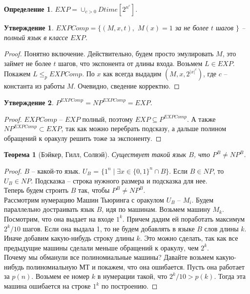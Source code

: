 \documentclass[12pt, letterpaper]{article}
\newtheorem{theorem}{Теорема}[section]
\newtheorem{prop}{Утверждение}[section]
\newtheorem{defi}{Определение}[section]
\newcommand{\leqp}{\leq_{p}}
\begin{document}
\begin{defi}
$EXP = \cup_{c>0} Dtime[2^{n^c}]$. 
\end{defi}

\begin{prop}
$EXPComp = \{(M, x, t), $ $M(x)=1$ за не более $t$ шагов $\}$ -- полный язык в классе $EXP$.
\end{prop}
\begin{proof}
Понятно включение. Действительно, будем просто эмулировать $M$, это займет не более $t$ шагов, что экспонента от длины входа. Возьмем $L \in EXP$. Покажем $L \leqp EXPComp$. По $x$ как всегда выдадим $(M, x, 2^{|x|^c})$, где $c$ -- константа из работы $M$. Очевидно, сведение корректно.
\end{proof}

\begin{prop}
$P^{EXPComp} = NP^{EXPComp} = EXP$.
\end{prop}
\begin{proof}
$EXPComp$ -- $EXP$ полный, поэтому $EXP \subseteq P^{EXPComp}$. А также $NP^{EXPComp} \subset EXP$, так как можно перебрать подсказу, а дальше полином обращений к оракулу решить тоже за экспоненту.
\end{proof}

\begin{theorem}[Бэйкер, Гилл, Солвэй]
Существует такой язык $B$, что $P^B \neq NP^B$.
\end{theorem}
\begin{proof}
$B$ -- какой-то язык. $U_B$ = $\{1^n\;|\;\exists x \in \{0,1\}^n \cap B \}$. Если $B \in NP$, то $U_B \in NP$. Подсказка -- строка нужного размера и подсказка для нее.\\
Теперь будем строить $B$ так, чтобы $P^B \neq NP^B$.\\
Рассмотрим нумерацию Машин Тьюринга с оракулом $U_B$ -- $M_i$. Будем параллельно достраивать язык $B$, идя по машинам. Возьмем машину $M_k$. Посмотрим, что она выдает на входе $1^k$. Причем дадим ей поработать максимум $2^k/10$ шагов. Если она выдала 1, то не будем добавлять в языке $B$ слов длины $k$. Иначе добавим какую-нибудь строку длины $k$. Это можно сделать, так как все предыдущие машины сделали меньше обращений к оракулу, чем $2^k$. \\
Почему мы обманули все полиномиальные машины? Давайте возьмем какую-нибудь полиномиальную МТ и покажем, что она ошибается. Пусть она работает за $p(n)$. Возьмем ее номер $k$ в нумерации такой, что $2^k / 10 > p(k)$. Тогда эта машина ошибается на строке $1^k$ по построению.
\end{proof}
\end{document}
